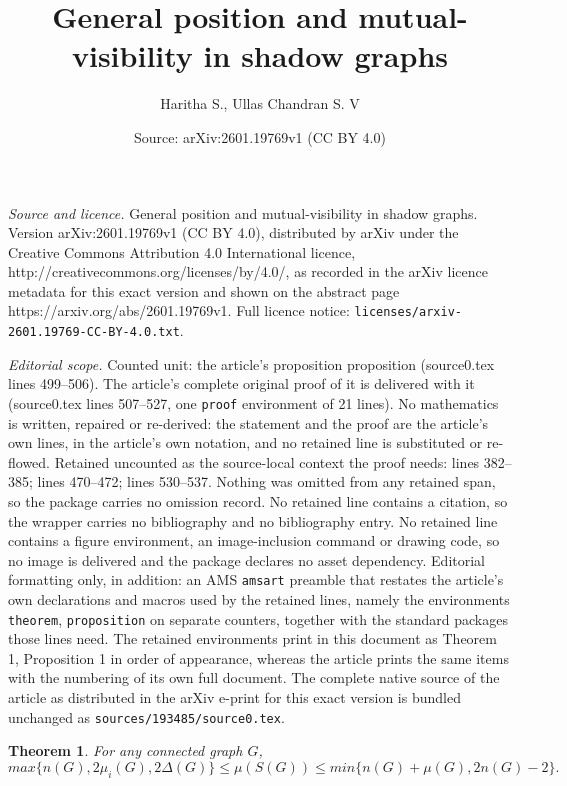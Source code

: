 \documentclass[10pt,a4paper]{amsart}
\title{General position and mutual-visibility in shadow graphs}
\author{Haritha S., Ullas Chandran S. V}
\date{Source: arXiv:2601.19769v1 (CC BY 4.0)}
\newtheorem{theorem}{Theorem}
\begin{document}
\maketitle

\noindent\emph{Source and licence.} General position and mutual-visibility in shadow graphs. Version arXiv:2601.19769v1 (CC BY 4.0), distributed by arXiv under the Creative Commons Attribution 4.0 International licence, http://creativecommons.org/licenses/by/4.0/, as recorded in the arXiv licence metadata for this exact version and shown on the abstract page https://arxiv.org/abs/2601.19769v1. Full licence notice: \texttt{licenses/arxiv-2601.19769-CC-BY-4.0.txt}.\par\smallskip

\noindent\textit{Editorial scope.} Counted unit: the article's proposition proposition (source0.tex lines 499--506). The article's complete original proof of it is delivered with it (source0.tex lines 507--527, one \texttt{proof} environment of 21 lines). No mathematics is written, repaired or re-derived: the statement and the proof are the article's own lines, in the article's own notation, and no retained line is substituted or re-flowed.  Retained uncounted as the source-local context the proof needs: lines 382--385; lines 470--472; lines 530--537.  Nothing was omitted from any retained span, so the package carries no omission record.  No retained line contains a citation, so the wrapper carries no bibliography and no bibliography entry.  No retained line contains a figure environment, an image-inclusion command or drawing code, so no image is delivered and the package declares no asset dependency.  Editorial formatting only, in addition: an AMS \texttt{amsart} preamble that restates the article's own declarations and macros used by the retained lines, namely the environments \texttt{theorem}, \texttt{proposition} on separate counters, together with the standard packages those lines need.  The retained environments print in this document as Theorem 1, Proposition 1 in order of appearance, whereas the article prints the same items with the numbering of its own full document.  The complete native source of the article as distributed in the arXiv e-print for this exact version is bundled unchanged as \texttt{sources/193485/source0.tex}.
\begin{theorem}\label{thm-bounds}
    For any connected graph $G$,
    $$max\{n(G),2\mu_{i}(G), 2\Delta(G)\} \leq \mu(S(G)) \leq min\{n(G)+\mu(G), 2n(G)-2\}.$$
\end{theorem}
\end{document}
